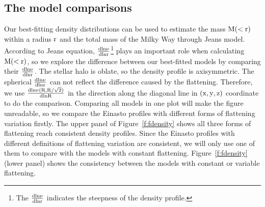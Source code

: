 \documentclass[12pt,preprint]{aastex}
\begin{document}
\subsection{The model comparisons}\label{sec:ModelComparison}
Our best-fitting density distributions can be used to estimate the mass $\rm M(<r)$ within a radius $\rm r$ and the total mass of the Milky Way through Jeans model. According to Jeans equation, $\rm \frac{dln\nu}{dlnr}$\footnote{The $\rm \frac{dln\nu}{dlnr}$ indicates the steepness of the density profile.} plays an important role when calculating $\rm M(<r)$, so we explore the difference between our best-fitted models by comparing their $\rm \frac{dln\nu}{dlnr}$. The stellar halo is oblate, so the density profile is axisymmetric. The spherical $\rm \frac{dln\nu}{dlnr}$ can not reflect the difference caused by the flattening. Therefore, we use $\rm \frac{dln\nu(R,R/\sqrt{2})}{dlnR}$ in the direction along the diagonal line in $\rm (x,y,z)$ coordinate to do the comparison. Comparing all models in one plot will make the figure unreadable, so we compare the Einasto profiles with different forms of flattening variation firstly. The upper panel of Figure~\ref{f:fdensity} shows all three forms of flattening reach consistent density profiles. Since the Einasto profiles with different definitions of flattening variation are consistent, we will only use one of them to compare with the models with constant flattening. Figure~\ref{f:fdensity} (lower panel) shows the consistency between the models with constant or variable flattening.
\end{document}
